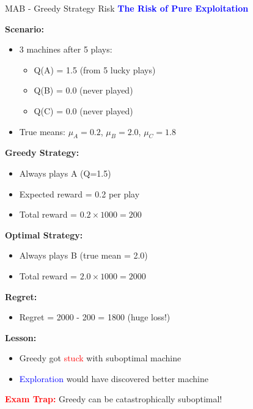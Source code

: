 \documentclass[8pt]{beamer}
\begin{document}
\begin{frame}{MAB - Greedy Strategy Risk}
\fontsize{6.5}{7.5}\selectfont
\textcolor{blue}{\textbf{The Risk of Pure Exploitation}}

\textbf{Scenario:}
\begin{itemize}
\item 3 machines after 5 plays:
\begin{itemize}
\item Q(A) = 1.5 (from 5 lucky plays)
\item Q(B) = 0.0 (never played)
\item Q(C) = 0.0 (never played)
\end{itemize}
\item True means: $\mu_A = 0.2$, $\mu_B = 2.0$, $\mu_C = 1.8$
\end{itemize}

\textbf{Greedy Strategy:}
\begin{itemize}
\item Always plays A (Q=1.5)
\item Expected reward = 0.2 per play
\item Total reward = $0.2 \times 1000 = 200$
\end{itemize}

\textbf{Optimal Strategy:}
\begin{itemize}
\item Always plays B (true mean = 2.0)
\item Total reward = $2.0 \times 1000 = 2000$
\end{itemize}

\textbf{Regret:}
\begin{itemize}
\item Regret = 2000 - 200 = 1800 (huge loss!)
\end{itemize}

\textbf{Lesson:}
\begin{itemize}
\item Greedy got \textcolor{red}{stuck} with suboptimal machine
\item \textcolor{blue}{Exploration} would have discovered better machine
\end{itemize}

\textcolor{red}{\textbf{Exam Trap:}} Greedy can be catastrophically suboptimal!
\end{frame}
\end{document}
